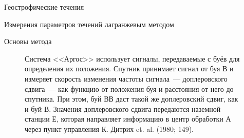 \begin{chapter}{Геострофические течения}
\begin{section}{Измерения параметров течений лагранжевым методом}
\begin{paragraph}{Основы метода}
\begin{figure}[t!]
\caption{Система <<Аргос>> использует сигналы, передаваемые с буёв для
определения их положения. Спутник принимает сигнал от буя В и измеряет
скорость изменения частоты сигнала~--- доплеровского сдвига~--- как
функцию от положения буя и расстояния от него до спутника. При этом,
буй ВВ даст такой же доплеровский сдвиг, как и буй В. Значения
доплеровского сдвига передаются наземной станции Е, которая направляет
информацию в центр обработки А через пункт управления К. Дитрих
et. al. (1980; 149).}
\label{fig:argos}
\end{figure}
%
\end{paragraph}


\end{section}
\end{chapter}
